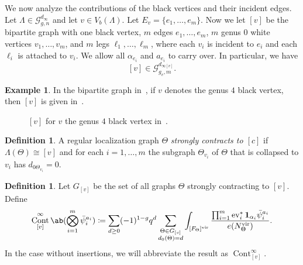 \documentclass[10pt]{amsart}
\theoremstyle{definition}
\newtheorem{defn}[thm]{Definition}
\newtheorem{exm}[thm]{Example}
\theoremstyle{remark}
\theoremstyle{plain}
\theoremstyle{definition}
\theoremstyle{remark}
\newcommand{\msc}[1]{\mathscr{#1}}
\newcommand{\mr}[1]{\mathrm{#1}}
\newcommand{\1}{\mathbf{1}}
\newcommand{\2}{\mathbf{2}}
\newcommand{\3}{\mathbf{3}}
\newcommand{\vir}{\mr{vir}}
\DeclareMathOperator{\ev}{ev}
\DeclareMathOperator{\Cont}{Cont}
\numberwithin{equation}{section}
\begin{document}
We now analyze the contributions of the black vertices and their incident edges. Let $\Lambda \in \msc{G}_{g,n}^{d_{\infty}}$ and let $v \in V_b(\Lambda)$. Let $E_v = \{e_1, \ldots, e_m \}$. Now we let $[v]$ be the bipartite graph with one black vertex, $m$ edges $e_1, \ldots, e_m$, $m$ genus $0$ white vertices $v_1, \ldots, v_m$, and $m$ legs $\ell_1, \ldots, \ell_m$, where each $v_i$ is incident to $e_i$ and each $\ell_i$ is attached to $v_i$. We allow all $\alpha_{e_i}$ and $a_{e_i}$ to carry over. In particular, we have
\[ [v] \in \msc{G}_{g_v, m}^{d_{\infty [v]}}. \]
\begin{exm}
    In the bipartite graph in~, if $v$ denotes the genus $4$ black vertex, then $[v]$ is given in~. 
    \begin{figure}[htpb]
    \begin{center}
    \end{center}
    \caption{$[v]$ for $v$ the genus $4$ black vertex in~.}%
    \label{fig:vertex}
    \end{figure}
\end{exm}

\begin{defn}
    A regular localization graph $\Theta$ \textit{strongly contracts to $[c]$} if $\Lambda(\Theta) \cong [v]$ and for each $i = 1, \ldots, m$ the subgraph $\Theta_{v_i}$ of $\Theta$ that is collapsed to $v_i$ has $d_{0\Theta_{v_i}} = 0$.
\end{defn}

\begin{defn}
    Let $G_{[v]}$ be the set of all graphs $\Theta$ strongly contracting to $[v]$. Define
    \[ \Cont_{[v]}^{\infty}\ab(\bigotimes_{i=1}^m \bar{\psi}_i^{a_i}) \coloneqq \sum_{d \geq 0} (-1)^{1-g} q^d \sum_{\substack{\Theta \in G_{[v]} \\ d_0(\Theta) = d}} \int_{[F_{\Theta}]^{\vir}} \frac{\prod_{i=1}^m \ev_i^* \1_{\alpha_i} \bar{\psi}_i^{a_i}}{e(N_{\Theta}^{\vir})}. \]
    In the case without insertions, we will abbreviate the result as $\Cont_{[v]}^{\infty}$.
\end{defn}
\end{document}
